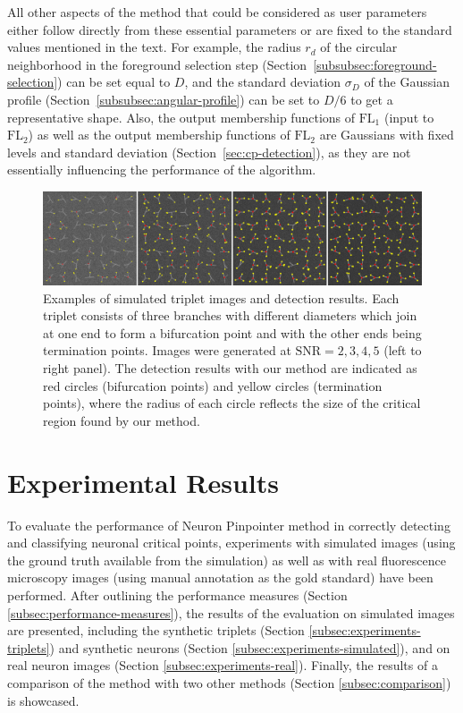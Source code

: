 All other aspects of the method that could be considered as user parameters either follow directly from these essential parameters or are fixed to the standard values mentioned in the text. For example, the radius $r_d$ of the circular neighborhood in the foreground selection step (Section~\ref{subsubsec:foreground-selection}) can be set equal to $D$, and the standard deviation $\sigma_{\!D}$ of the Gaussian profile (Section~\ref{subsubsec:angular-profile}) can be set to $D/6$ to get a representative shape. Also, the output membership functions of $\textrm{FL}_1$ (input to $\textrm{FL}_2$) as well as the output membership functions of $\textrm{FL}_2$ are Gaussians with fixed levels and standard deviation (Section~\ref{sec:cp-detection}), as they are not essentially influencing the performance of the algorithm.
\begin{figure}%
	\centering
	\includegraphics[width=\columnwidth]{fig12}
	\caption{Examples of simulated triplet images and detection results. Each triplet consists of three branches with different diameters which join at one end to form a bifurcation point and with the other ends being termination points. Images were generated at $\textrm{SNR}=2,3,4,5$ (left to right panel). The detection results with our method are indicated as red circles (bifurcation points) and yellow circles (termination points), where the radius of each circle reflects the size of the critical region found by our method.}
	\label{fig12}
\end{figure}
\section{Experimental Results}
\label{sec:experiments}
To evaluate the performance of Neuron Pinpointer method in correctly detecting and classifying neuronal critical points, experiments with simulated images (using the ground truth available from the simulation) as well as with real fluorescence microscopy images (using manual annotation as the gold standard) have been performed. After outlining the performance measures (Section \ref{subsec:performance-measures}), the results of the evaluation on simulated images are presented, including the synthetic triplets (Section \ref{subsec:experiments-triplets}) and synthetic neurons (Section \ref{subsec:experiments-simulated}), and on real neuron images (Section \ref{subsec:experiments-real}). Finally, the results of a comparison of the method with two other methods (Section \ref{subsec:comparison}) is showcased.
